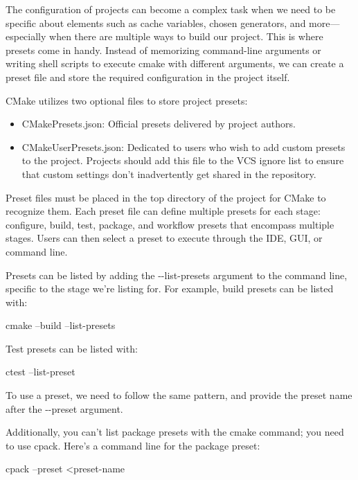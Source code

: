 The configuration of projects can become a complex task when we need to be specific about elements such as cache variables, chosen generators, and more—especially when there are multiple ways to build our project. This is where presets come in handy. Instead of memorizing command-line arguments or writing shell scripts to execute cmake with different arguments, we can create a preset file and store the required configuration in the project itself.

CMake utilizes two optional files to store project presets:

\begin{itemize}
\item
CMakePresets.json: Official presets delivered by project authors.

\item
CMakeUserPresets.json: Dedicated to users who wish to add custom presets to the project. Projects should add this file to the VCS ignore list to ensure that custom settings don’t inadvertently get shared in the repository.
\end{itemize}

Preset files must be placed in the top directory of the project for CMake to recognize them. Each preset file can define multiple presets for each stage: configure, build, test, package, and workflow presets that encompass multiple stages. Users can then select a preset to execute through the IDE, GUI, or command line.

Presets can be listed by adding the -{}-list-presets argument to the command line, specific to the stage we’re listing for. For example, build presets can be listed with:

\begin{shell}
cmake --build --list-presets
\end{shell}

Test presets can be listed with:

\begin{shell}
ctest --list-preset
\end{shell}

To use a preset, we need to follow the same pattern, and provide the preset name after the -{}-preset argument.

Additionally, you can’t list package presets with the cmake command; you need to use cpack. Here’s a command line for the package preset:

\begin{shell}
cpack --preset <preset-name
\end{shell}

